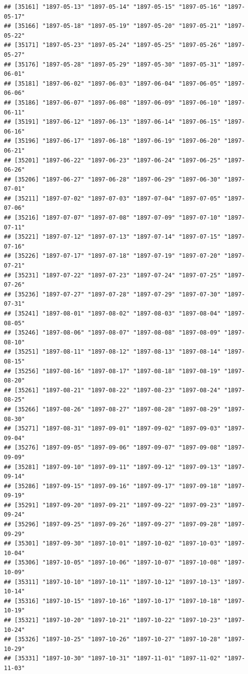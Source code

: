 \documentclass{article}\usepackage[]{graphicx}\usepackage[]{color}
\makeatletter
\newenvironment{kframe}{%
 \def\at@end@of@kframe{}%
 \ifinner\ifhmode%
  \def\at@end@of@kframe{\end{minipage}}%
  \begin{minipage}{\columnwidth}%
 \fi\fi%
 \def\FrameCommand##1{\hskip\@totalleftmargin \hskip-\fboxsep
 \colorbox{shadecolor}{##1}\hskip-\fboxsep
     \hskip-\linewidth \hskip-\@totalleftmargin \hskip\columnwidth}%
 \MakeFramed {\advance\hsize-\width
   \@totalleftmargin\z@ \linewidth\hsize
   \@setminipage}}%
 {\par\unskip\endMakeFramed%
 \at@end@of@kframe}
\newenvironment{knitrout}{}{} %
\makeatother
\begin{document}
\begin{description}
\begin{knitrout}
\begin{kframe}
\begin{verbatim}
## [35161] "1897-05-13" "1897-05-14" "1897-05-15" "1897-05-16" "1897-05-17"
## [35166] "1897-05-18" "1897-05-19" "1897-05-20" "1897-05-21" "1897-05-22"
## [35171] "1897-05-23" "1897-05-24" "1897-05-25" "1897-05-26" "1897-05-27"
## [35176] "1897-05-28" "1897-05-29" "1897-05-30" "1897-05-31" "1897-06-01"
## [35181] "1897-06-02" "1897-06-03" "1897-06-04" "1897-06-05" "1897-06-06"
## [35186] "1897-06-07" "1897-06-08" "1897-06-09" "1897-06-10" "1897-06-11"
## [35191] "1897-06-12" "1897-06-13" "1897-06-14" "1897-06-15" "1897-06-16"
## [35196] "1897-06-17" "1897-06-18" "1897-06-19" "1897-06-20" "1897-06-21"
## [35201] "1897-06-22" "1897-06-23" "1897-06-24" "1897-06-25" "1897-06-26"
## [35206] "1897-06-27" "1897-06-28" "1897-06-29" "1897-06-30" "1897-07-01"
## [35211] "1897-07-02" "1897-07-03" "1897-07-04" "1897-07-05" "1897-07-06"
## [35216] "1897-07-07" "1897-07-08" "1897-07-09" "1897-07-10" "1897-07-11"
## [35221] "1897-07-12" "1897-07-13" "1897-07-14" "1897-07-15" "1897-07-16"
## [35226] "1897-07-17" "1897-07-18" "1897-07-19" "1897-07-20" "1897-07-21"
## [35231] "1897-07-22" "1897-07-23" "1897-07-24" "1897-07-25" "1897-07-26"
## [35236] "1897-07-27" "1897-07-28" "1897-07-29" "1897-07-30" "1897-07-31"
## [35241] "1897-08-01" "1897-08-02" "1897-08-03" "1897-08-04" "1897-08-05"
## [35246] "1897-08-06" "1897-08-07" "1897-08-08" "1897-08-09" "1897-08-10"
## [35251] "1897-08-11" "1897-08-12" "1897-08-13" "1897-08-14" "1897-08-15"
## [35256] "1897-08-16" "1897-08-17" "1897-08-18" "1897-08-19" "1897-08-20"
## [35261] "1897-08-21" "1897-08-22" "1897-08-23" "1897-08-24" "1897-08-25"
## [35266] "1897-08-26" "1897-08-27" "1897-08-28" "1897-08-29" "1897-08-30"
## [35271] "1897-08-31" "1897-09-01" "1897-09-02" "1897-09-03" "1897-09-04"
## [35276] "1897-09-05" "1897-09-06" "1897-09-07" "1897-09-08" "1897-09-09"
## [35281] "1897-09-10" "1897-09-11" "1897-09-12" "1897-09-13" "1897-09-14"
## [35286] "1897-09-15" "1897-09-16" "1897-09-17" "1897-09-18" "1897-09-19"
## [35291] "1897-09-20" "1897-09-21" "1897-09-22" "1897-09-23" "1897-09-24"
## [35296] "1897-09-25" "1897-09-26" "1897-09-27" "1897-09-28" "1897-09-29"
## [35301] "1897-09-30" "1897-10-01" "1897-10-02" "1897-10-03" "1897-10-04"
## [35306] "1897-10-05" "1897-10-06" "1897-10-07" "1897-10-08" "1897-10-09"
## [35311] "1897-10-10" "1897-10-11" "1897-10-12" "1897-10-13" "1897-10-14"
## [35316] "1897-10-15" "1897-10-16" "1897-10-17" "1897-10-18" "1897-10-19"
## [35321] "1897-10-20" "1897-10-21" "1897-10-22" "1897-10-23" "1897-10-24"
## [35326] "1897-10-25" "1897-10-26" "1897-10-27" "1897-10-28" "1897-10-29"
## [35331] "1897-10-30" "1897-10-31" "1897-11-01" "1897-11-02" "1897-11-03"

\end{verbatim}
\end{kframe}
\end{knitrout}
\end{description}
\end{document}

